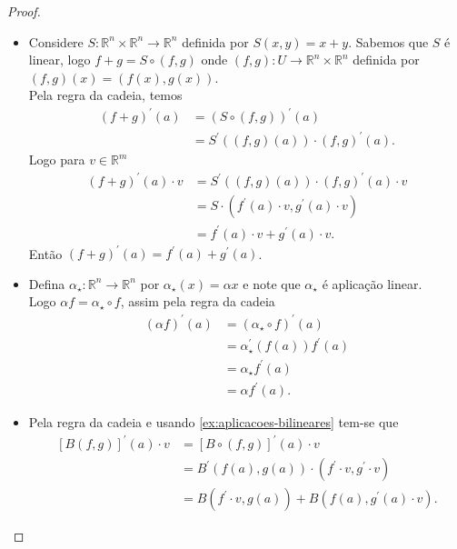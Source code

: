 \begin{proof} 
  \begin{itemize}
    \item Considere $S:\mathbb{R}^{n}\times\mathbb{R}^{n}\to\mathbb{R}^{n}$ definida por $S(x,y)=x+y$. Sabemos que $S$ é linear, logo $f+g=S\circ (f,g)$ onde $(f,g):U\to\mathbb{R}^{n}\times\mathbb{R}^{n}$ definida por $(f,g)(x)=(f(x),g(x))$.\\
      Pela regra da cadeia, temos
      \begin{align*}
        (f+g)^{\prime}(a)&=(S\circ (f,g))^{\prime}(a)\\
        &=S^{\prime}((f,g)(a))\cdot (f,g)^{\prime}(a).
      \end{align*}
      Logo para $v\in\mathbb{R}^{m}$
      \begin{align*}
        (f+g)^{\prime}(a)\cdot v&=S^{\prime}((f,g)(a))\cdot(f,g)^{\prime}(a)\cdot v\\
        &=S\cdot(f^{\prime}(a)\cdot v,g^{\prime}(a)\cdot v)\\
        &=f^{\prime}(a)\cdot v+g^{\prime}(a)\cdot v.
      \end{align*}
      Então $(f+g)^{\prime}(a)=f^{\prime}(a)+g^{\prime}(a)$.
    \item Defina $\alpha_\star:\mathbb{R}^{n}\to\mathbb{R}^{n}$ por $\alpha_\star(x)=\alpha x$ e note que $\alpha_\star$ é aplicação linear.\\
      Logo $\alpha f=\alpha_\star\circ f$, assim pela regra da cadeia
      \begin{align*}
        (\alpha f)^{\prime}(a)&=(\alpha_\star \circ f)^{\prime}(a)\\
        &=\alpha_\star^{\prime}(f(a))f^{\prime}(a)\\
        &=\alpha_\star f^{\prime}(a)\\
        &=\alpha f^{\prime}(a).
      \end{align*}
    \item Pela regra da cadeia e usando \ref{ex:aplicacoes-bilineares} tem-se que 
      \begin{align*}
        \left[ B\left( f,g \right)\right]^{\prime}(a)\cdot v&=\left[ B\circ (f,g) \right]^{\prime}(a)\cdot v\\
        &=B^{\prime}\left( f(a),g(a) \right)\cdot\left( f^{\prime}\cdot v,g^{\prime}\cdot v\right)\\
        &=B\left( f^{\prime}\cdot v,g(a) \right)+B\left( f(a),g^{\prime}(a)\cdot v \right).
      \end{align*}
  \end{itemize}
\end{proof}
